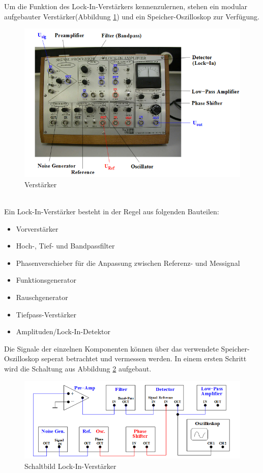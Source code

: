 Um die Funktion des Lock-In-Verstärkers kennenzulernen, stehen ein modular
aufgebauter Verstärker(Abbildung \ref{fig:verstärker}) und ein
Speicher-Oszilloskop zur Verfügung.
\begin{figure}[h]
  \centering
  \includegraphics[width=\textwidth]{Bilder/Verstaerker.jpg}
  \caption{Verstärker}
  \label{fig:verstärker}
\end{figure}
\\
Ein Lock-In-Verstärker besteht in der Regel aus folgenden Bauteilen:
\begin{itemize}
  \item Vorverstärker
  \item Hoch-, Tief- und Bandpassfilter
  \item Phasenverschieber für die Anpassung zwischen Referenz- und Messignal
  \item Funktionsgenerator
  \item Rauschgenerator
  \item Tiefpass-Verstärker
  \item Amplituden/Lock-In-Detektor
\end{itemize}
Die Signale der einzelnen Komponenten können über das verwendete
Speicher-Oszilloskop seperat betrachtet und vermessen werden.
\newpage
In einem ersten Schritt wird die Schaltung aus Abbildung \ref{fig:schalt}
aufgebaut.
\begin{figure}[h]
  \centering
  \includegraphics[width=\textwidth]{Bilder/Schaltung.jpg}
  \caption{Schaltbild Lock-In-Verstärker}
  \label{fig:schalt}
\end{figure}

